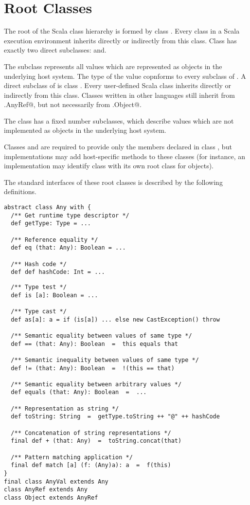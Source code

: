\documentclass[11pt]{report}
\begin{document}
\section{Root Classes}
\label{sec:cls-root}
\label{sec:cls-any}
\label{sec:cls-object}

The root of the Scala class hierarchy is formed by class \verb@Any@.
Every class in a Scala execution environment inherits directly or
indirectly from this class.  Class \verb@Any@ has exactly two direct
subclasses: \verb@AnyRef@ and\verb@AnyVal@.

The subclass \verb@AnyRef@ represents all values which are represented
as objects in the underlying host system. The type of the \verb@null@
value copnforms to every subclass of \verb@AnyRef@.  A direct subclass
of
\verb@AnyRef@ is class \verb@Object@. Every user-defined Scala
class inherits directly or indirectly from this class. Classes written
in other languages still inherit from \verb@scala.AnyRef@, but not
necessarily from \verb@scala.Object@.

The class \verb@AnyVal@ has a fixed number subclasses, which describe
values which are not implemented as objects in the underlying host
system.

Classes \verb@AnyRef@ and \verb@AnyVal@ are required to provide only
the members declared in class \verb@Any@, but implementations may add
host-specific methods to these classes (for instance, an
implementation may identify class \verb@AnyRef@ with its own root
class for objects).

The standard interfaces of these root classes is described by the
following definitions.

\begin{verbatim}
abstract class Any with {
  /** Get runtime type descriptor */
  def getType: Type = ...

  /** Reference equality */
  def eq (that: Any): Boolean = ...

  /** Hash code */
  def def hashCode: Int = ...
\end{verbatim}
\begin{verbatim}
  /** Type test */
  def is [a]: Boolean = ...

  /** Type cast */
  def as[a]: a = if (is[a]) ... else new CastException() throw

  /** Semantic equality between values of same type */
  def == (that: Any): Boolean  =  this equals that

  /** Semantic inequality between values of same type */
  def != (that: Any): Boolean  =  !(this == that)

  /** Semantic equality between arbitrary values */
  def equals (that: Any): Boolean  =  ...

  /** Representation as string */
  def toString: String  =  getType.toString ++ "@" ++ hashCode

  /** Concatenation of string representations */
  final def + (that: Any)  =  toString.concat(that)

  /** Pattern matching application */
  final def match [a] (f: (Any)a): a  =  f(this)
}
final class AnyVal extends Any
class AnyRef extends Any
class Object extends AnyRef
\end{verbatim}
\end{document}

